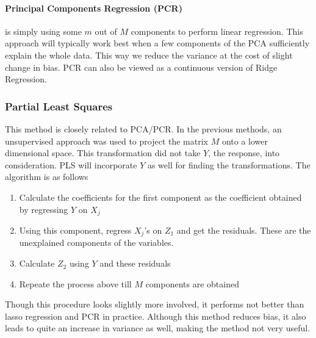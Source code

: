 \documentclass[11pt, a4paper]{article}
\begin{document}
    \paragraph{Principal Components Regression (PCR)}
    is simply using some $m$ out of $M$ components to perform linear regression. This approach will typically work best when a few components of the PCA sufficiently explain the whole data. This way we reduce the variance at the cost of slight change in bias. PCR can also be viewed as a continuous version of Ridge Regression.
    

    \subsubsection{Partial Least Squares}
    This method is closely related to PCA/PCR. In the previous methods, an unsupervised approach was used to project the matrix $M$ onto a lower dimensional space. This transformation did not take $Y$, the response, into consideration. PLS will incorporate $Y$ as well for finding the transformations.\newline
    The algorithm is as follows
    \begin{enumerate}
        \item Calculate the coefficients for the first component as the coefficient obtained by regressing $Y$ on $X_{j}$
        \item Using this component, regress $X_{j}$'s on $Z_{1}$ and get the residuals. These are the unexplained components of the variables.
        \item Calculate $Z_{2}$ using $Y$ and these residuals
        \item Repeate the process above till $M$ components are obtained
    \end{enumerate}

    Though this procedure looks slightly more involved, it performs not better than lasso regression and PCR in practice. Although this method reduces bias, it also leads to quite an increase in variance as well, making the method not very useful.

\end{document}
